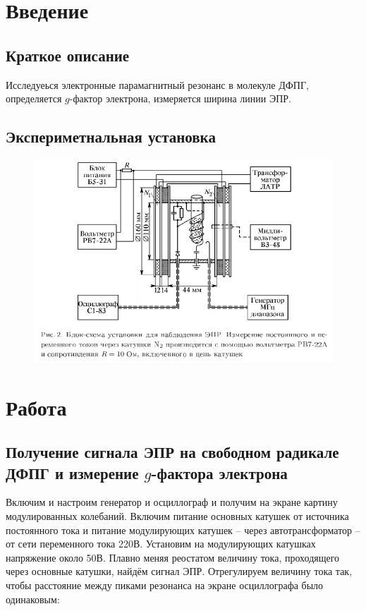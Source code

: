 \documentclass{article}
\author{Александр Романов Б01-110}
\date{}
\title{}
\begin{document}
\maketitle
\section{Введение}
\subsection{Краткое описание}
Исследуеься электронные парамагнитный резонанс в молекуле ДФПГ, определяется \(g\)-фактор электрона,
измеряется ширина линии ЭПР.

\subsection{Экспериметнальная установка}
\begin{figure}[H]
	\includegraphics[width=\textwidth]{scheme.png}
\end{figure}
\section{Работа}
\subsection{Получение сигнала ЭПР на свободном радикале ДФПГ и измерение \(g\)-фактора электрона}
Включим и настроим генератор и осциллограф и получим на экране картину модулированных колебаний. 
Включим питание основных катушек от источника постоянного тока и питание модулирующих катушек 
-- через автотрансформатор -- от сети переменного тока 220В. 
Установим на модулирующих катушках напряжение около 50В. Плавно меняя реостатом величину тока,
проходящего через основные катушки, найдём сигнал ЭПР. Отрегулируем величину тока так, чтобы 
расстояние между пиками резонанса на экране осциллографа было одинаковым:
\end{document}
